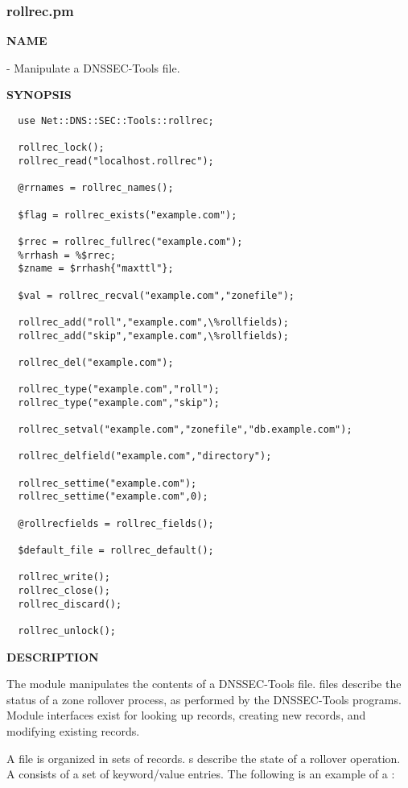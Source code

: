 \clearpage

\subsubsection{rollrec.pm}

{\bf NAME}

 - Manipulate a DNSSEC-Tools
 file.

{\bf SYNOPSIS}

\begin{verbatim}
  use Net::DNS::SEC::Tools::rollrec;

  rollrec_lock();
  rollrec_read("localhost.rollrec");

  @rrnames = rollrec_names();

  $flag = rollrec_exists("example.com");

  $rrec = rollrec_fullrec("example.com");
  %rrhash = %$rrec;
  $zname = $rrhash{"maxttl"};

  $val = rollrec_recval("example.com","zonefile");

  rollrec_add("roll","example.com",\%rollfields);
  rollrec_add("skip","example.com",\%rollfields);

  rollrec_del("example.com");

  rollrec_type("example.com","roll");
  rollrec_type("example.com","skip");

  rollrec_setval("example.com","zonefile","db.example.com");

  rollrec_delfield("example.com","directory");

  rollrec_settime("example.com");
  rollrec_settime("example.com",0);

  @rollrecfields = rollrec_fields();

  $default_file = rollrec_default();

  rollrec_write();
  rollrec_close();
  rollrec_discard();

  rollrec_unlock();
\end{verbatim}

{\bf DESCRIPTION}

The  module manipulates the contents of
a DNSSEC-Tools  file.   files describe the
status of a zone rollover process, as performed by the DNSSEC-Tools programs.
Module interfaces exist for looking up  records, creating new
records, and modifying existing records.

A  file is organized in sets of  records.
s describe the state of a rollover operation.  A
 consists of a set of keyword/value entries.  The following is
an example of a :

